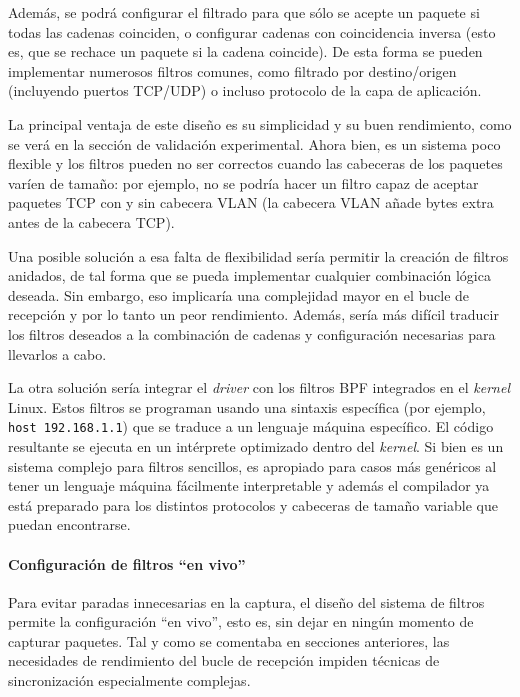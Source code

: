 \documentclass[oneside, draft]{epstfg}
\begin{document}
Además, se podrá configurar el filtrado para que sólo se acepte un paquete si todas las cadenas coinciden, o configurar cadenas con coincidencia inversa (esto es, que se rechace un paquete si la cadena coincide). De esta forma se pueden implementar numerosos filtros comunes, como filtrado por destino/origen (incluyendo puertos TCP/UDP) o incluso protocolo de la capa de aplicación.

La principal ventaja de este diseño es su simplicidad y su buen rendimiento, como se verá en la sección de validación experimental. Ahora bien, es un sistema poco flexible y los filtros pueden no ser correctos cuando las cabeceras de los paquetes varíen de tamaño: por ejemplo, no se podría hacer un filtro capaz de aceptar paquetes TCP con y sin cabecera VLAN (la cabecera VLAN añade bytes extra antes de la cabecera TCP).

Una posible solución a esa falta de flexibilidad sería permitir la creación de filtros anidados, de tal forma que se pueda implementar cualquier combinación lógica deseada. Sin embargo, eso implicaría una complejidad mayor en el bucle de recepción y por lo tanto un peor rendimiento. Además, sería más difícil traducir los filtros deseados a la combinación de cadenas y configuración necesarias para llevarlos a cabo.

La otra solución sería integrar el \textit{driver} con los filtros \gls{BPF} integrados en el \textit{kernel} Linux. Estos filtros se programan usando una sintaxis específica (por ejemplo, \texttt{host 192.168.1.1}) que se traduce a un lenguaje máquina específico. El código resultante se ejecuta en un intérprete optimizado dentro del \textit{kernel}. Si bien es un sistema complejo para filtros sencillos, es apropiado para casos más genéricos al tener un lenguaje máquina fácilmente interpretable y además el compilador ya está preparado para los distintos protocolos y cabeceras de tamaño variable que puedan encontrarse.

\paragraph{Configuración de filtros ``en vivo''}

Para evitar paradas innecesarias en la captura, el diseño del sistema de filtros permite la configuración ``en vivo'', esto es, sin dejar en ningún momento de capturar paquetes. Tal y como se comentaba en secciones anteriores, las necesidades de rendimiento del bucle de recepción impiden técnicas de sincronización especialmente complejas.
\end{document}
